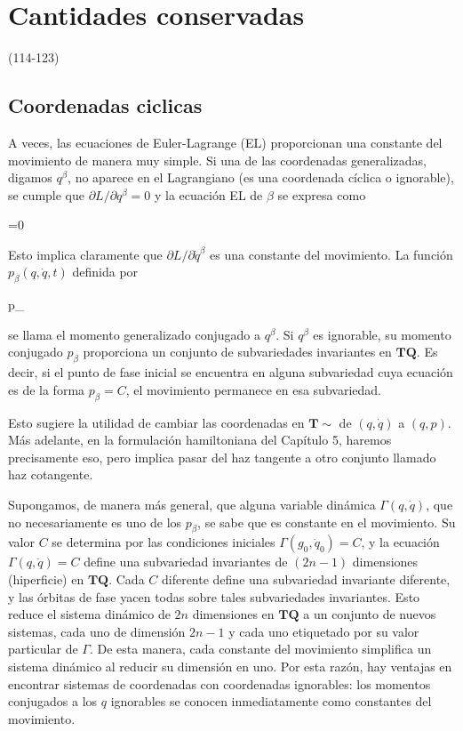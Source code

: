 \section{Cantidades conservadas}(114-123)
\subsection{Coordenadas ciclicas}
A veces, las ecuaciones de Euler-Lagrange (EL) proporcionan una constante del movimiento de manera muy simple. Si una de las coordenadas generalizadas, digamos $q^{\beta}$, no aparece en el Lagrangiano (es una coordenada cíclica o ignorable), se cumple que $\partial L / \partial q^{\beta}=0$ y la ecuación EL de $\beta$ se expresa como


\begin{DispWithArrows}[displaystyle, format=c]
 =0 
\end{DispWithArrows}


Esto implica claramente que $\partial L / \partial \dot{q}^{\beta}$ es una constante del movimiento. La función $p_{\beta}(q, \dot{q}, t)$ definida por


\begin{DispWithArrows}[displaystyle, format=c]
p_{\beta} \equiv {} 
\end{DispWithArrows}


se llama el momento generalizado conjugado a $q^{\beta}$. Si $q^{\beta}$ es ignorable, su momento conjugado $p_{\beta}$ proporciona un conjunto de subvariedades invariantes en $\mathbf{T Q}$. Es decir, si el punto de fase inicial se encuentra en alguna subvariedad cuya ecuación es de la forma $p_{\beta}=C$, el movimiento permanece en esa subvariedad.

Esto sugiere la utilidad de cambiar las coordenadas en $\mathbf{T} \mathbb{\sim}$ de $(q, \dot{q})$ a $(q, p)$. Más adelante, en la formulación hamiltoniana del Capítulo 5, haremos precisamente eso, pero implica pasar del haz tangente a otro conjunto llamado haz cotangente.

Supongamos, de manera más general, que alguna variable dinámica $\Gamma(q, \dot{q})$, que no necesariamente es uno de los $p_{\beta}$, se sabe que es constante en el movimiento. Su valor $C$ se determina por las condiciones iniciales $\Gamma\left(g_{0}, \dot{q}_{0}\right)=C$, y la ecuación $\Gamma(q, \dot{q})=C$ define una subvariedad invariantes de $(2 n-1)$ dimensiones (hiperficie) en $\mathbf{T Q}$. Cada $C$ diferente define una subvariedad invariante diferente, y las órbitas de fase yacen todas sobre tales subvariedades invariantes. Esto reduce el sistema dinámico de $2 n$ dimensiones en $\mathbf{T Q}$ a un conjunto de nuevos sistemas, cada uno de dimensión $2 n-1$ y cada uno etiquetado por su valor particular de $\Gamma$. De esta manera, cada constante del movimiento simplifica un sistema dinámico al reducir su dimensión en uno. Por esta razón, hay ventajas en encontrar sistemas de coordenadas con coordenadas ignorables: los momentos conjugados a los $q$ ignorables se conocen inmediatamente como constantes del movimiento.

